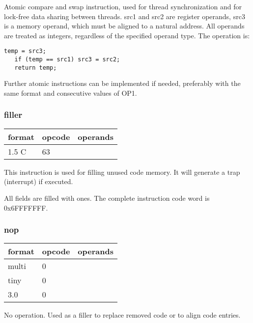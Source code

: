 \documentclass[forwardcom.tex]{subfiles}
\begin{document}
Atomic compare and swap instruction, used for thread synchronization and for lock-free data sharing between threads. src1 and src2 are register operands, src3 is a memory operand, which must be aligned to a natural address. All operands are treated as integers, regardless of the specified operand type. The operation is:

\begin{lstlisting}[frame=none]
   temp = src3;
   if (temp == src1) src3 = src2;
   return temp;
\end{lstlisting}

Further atomic instructions can be implemented if needed, preferably with the same format and consecutive values of OP1.

\subsubsection{filler}
\label{table:fillerInstruction}
\begin{tabular}{|p{12mm}|p{12mm}|p{110mm}|}
\hline
\bfseries format & \bfseries opcode & \bfseries operands \\ \hline
1.5 C & 63 & \\ \hline
\end{tabular}
\vspace{2mm}

This instruction is used for filling unused code memory. It will generate a trap (interrupt) if executed.
\vspace{2mm}

All fields are filled with ones. The complete instruction code word is 0x6FFFFFFF.

\subsubsection{nop}
\label{table:nopInstruction}
\begin{tabular}{|p{12mm}|p{12mm}|p{110mm}|}
\hline
\bfseries format & \bfseries opcode & \bfseries operands \\ \hline
multi &  0 & \\ \hline
tiny  &  0 & \\ \hline
3.0   &  0 & \\ \hline
\end{tabular}
\vspace{2mm}

No operation. Used as a filler to replace removed code or to align code entries.
\vspace{2mm}
\end{document}
